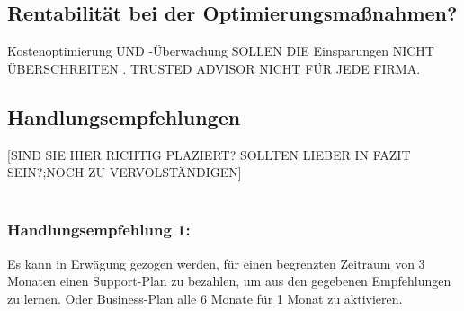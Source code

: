 \subsection*{Rentabilität bei der Optimierungsmaßnahmen?}
Kostenoptimierung UND -Überwachung SOLLEN DIE Einsparungen NICHT ÜBERSCHREITEN . 
TRUSTED ADVISOR NICHT FÜR JEDE FIRMA.

\subsection*{Handlungsempfehlungen}
[SIND SIE HIER RICHTIG PLAZIERT? SOLLTEN LIEBER IN FAZIT SEIN?;NOCH ZU VERVOLSTÄNDIGEN]
\\\\
\subsubsection*{Handlungsempfehlung 1:} 
Es kann in Erwägung gezogen werden, für einen begrenzten Zeitraum von 3 Monaten einen Support-Plan zu bezahlen, um aus den gegebenen Empfehlungen zu lernen. Oder Business-Plan alle 6 Monate für 1 Monat zu aktivieren.  
\\\\

